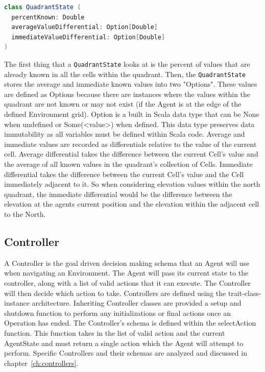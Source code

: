 \begin{lstlisting}[language=Scala]
class QuadrantState (
  percentKnown: Double
  averageValueDifferential: Option[Double]
  immediateValueDifferential: Option[Double]
)
\end{lstlisting}

The first thing that a \texttt{QuadrantState} looks at is the percent of values that are already known in all the cells within the quadrant.
Then, the \texttt{QuadrantState} stores the average and immediate known values into two "Options".
These values are defined as Options because there are instances where the values within the quadrant are not known or may not exist (if the Agent is at the edge of the defined Environment grid).
Option is a built in Scala data type that can be None when undefined or Some(<value>) when defined.
This data type preserves data immutability as all variables must be defined within Scala code.
Average and immediate values are recorded as differentials relative to the value of the current cell.
Average differential takes the difference between the current Cell's value and the average of all known values in the quadrant's collection of Cells.
Immediate differential takes the difference between the current Cell's value and the Cell immediately adjacent to it.
So when considering elevation values within the north quadrant, the immediate differential would be the difference between the elevation at the agents current position and the elevation within the adjacent cell to the North.


\subsection{Controller} \label{subsec:controller}
A Controller is the goal driven decision making schema that an Agent will use when navigating an Environment.
The Agent will pass its current state to the controller, along with a list of valid actions that it can execute.
The Controller will then decide which action to take.
Controllers are defined using the trait-class-instance architecture.
Inheriting Controller classes are provided a setup and shutdown function to perform any initializations or final actions once an Operation has ended.
The Controller's schema is defined within the selectAction function.
This function takes in the list of valid action and the current AgentState and must return a single action which the Agent will attempt to perform.
Specific Controllers and their schemas are analyzed and discussed in chapter~\ref{ch:controllers}.

